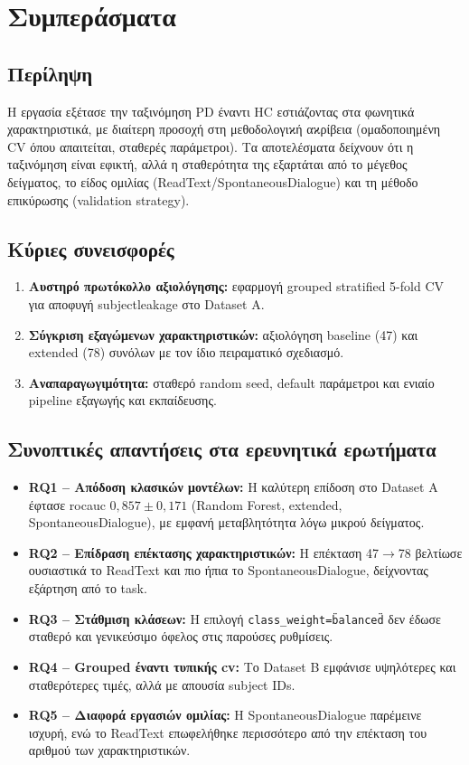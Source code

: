 
\chapter{Συμπεράσματα}
\label{ch:conclusion}

\section{Περίληψη}

Η εργασία εξέτασε την ταξινόμηση PD έναντι HC εστιάζοντας στα φωνητικά χαρακτηριστικά, 
με διαίτερη προσοχή στη μεθοδολογιϰή αϰρίβεια (ομαδοποιημένη CV όπου απαιτείται, σταθερές παράμετροι). 
Τα αποτελέσματα δείχνουν ότι η ταξινόμηση είναι εφικτή, αλλά η σταθερότητα της εξαρτάται από το μέγεθος δείγματος, το είδος ομιλίας (ReadText/SpontaneousDialogue) και τη μέθοδο επικύρωσης (validation strategy).

\section{Κύριες συνεισφορές}

\begin{enumerate}
    \item \textbf{Αυστηρό πρωτόκολλο αξιολόγησης:} εφαρμογή grouped stratified 5-fold CV για αποφυγή \gls{subjectleakage} στο Dataset A.
    \item \textbf{Σύγκριση εξαγώμενων χαρακτηριστικών:} αξιολόγηση baseline (47) και extended (78) συνόλων με τον ίδιο πειραματικό σχεδιασμό.
    \item \textbf{Αναπαραγωγιμότητα:} σταθερό random seed, default παράμετροι και ενιαίο pipeline εξαγωγής και εκπαίδευσης.
\end{enumerate}

\section{Συνοπτικές απαντήσεις στα ερευνητικά ερωτήματα}

\begin{itemize}
    \item \textbf{RQ1 -- Απόδοση κλασικών μοντέλων:} Η καλύτερη επίδοση στο Dataset A έφτασε \gls{rocauc} $0{,}857 \pm 0{,}171$ (Random Forest, extended, SpontaneousDialogue), με εμφανή μεταβλητότητα λόγω μικρού δείγματος.
    \item \textbf{RQ2 -- Επίδραση επέκτασης χαρακτηριστικών:} Η επέκταση 47\(\rightarrow\)78 βελτίωσε ουσιαστικά το ReadText και πιο ήπια το SpontaneousDialogue, δείχνοντας εξάρτηση από το task.
    \item \textbf{RQ3 -- Στάθμιση κλάσεων:} Η επιλογή \texttt{class\_weight=\"balanced\"} δεν έδωσε σταθερό και γενικεύσιμο όφελος στις παρούσες ρυθμίσεις.
    \item \textbf{RQ4 -- Grouped έναντι τυπικής \gls{cv}:} Το Dataset B εμφάνισε υψηλότερες και σταθερότερες τιμές, αλλά με απουσία subject IDs.
    \item \textbf{RQ5 -- Διαφορά εργασιών ομιλίας:} Η SpontaneousDialogue παρέμεινε ισχυρή, ενώ το ReadText επωφελήθηκε περισσότερο από την επέκταση του αριθμού των χαρακτηριστικών.
\end{itemize}

